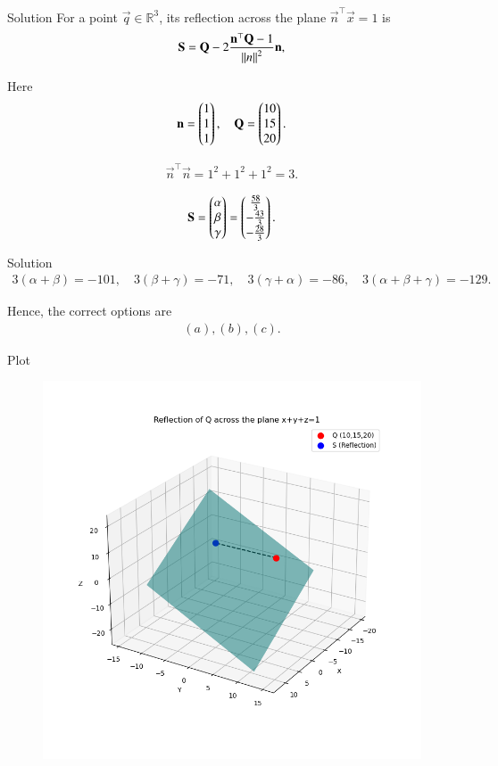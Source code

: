 \documentclass{beamer}
\begin{document}
\begin{frame}{Solution}
    For a point $\vec q \in \mathbb{R}^3$, its reflection across the plane 
$\vec{n}^\top\vec{x} = 1$ is
\begin{align}
\mathbf{S} = \mathbf{Q}-2\frac{\mathbf{n}^\top\mathbf{Q}-1}{\left\lVert n\right\rVert^2}\mathbf{n},
\end{align}

Here
\begin{align}
\mathbf{n} = \begin{pmatrix}1\\1\\1\end{pmatrix},  
\quad \mathbf{Q} = \begin{pmatrix}10\\15\\20\end{pmatrix}.
\end{align}

\begin{align}
\vec{n}^\top\vec n = 1^2+1^2+1^2=3.
\end{align}


\begin{align}
\mathbf{S}=\begin{pmatrix}\alpha \\ \beta \\ \gamma\end{pmatrix} = \begin{pmatrix}\frac{58}{3} \\ -\frac{43}{3} \\ -\frac{28}{3}\end{pmatrix}.
\end{align}
\end{frame}

\begin{frame}{Solution}
    \begin{align}
3(\alpha+\beta) = -101,\quad
3(\beta+\gamma) = -71,\quad
3(\gamma+\alpha) = -86,\quad
3(\alpha+\beta+\gamma) = -129.
\end{align}

Hence, the correct options are
\begin{align}
\boxed{(a), (b), (c)}.
\end{align}
\end{frame}

\begin{frame}{Plot}
    \begin{figure}
        \centering
        \includegraphics[width=0.5\linewidth]{figs/plot10.png}
        \caption{}
        \label{fig:placeholder}
    \end{figure}
\end{frame}
\end{document}
